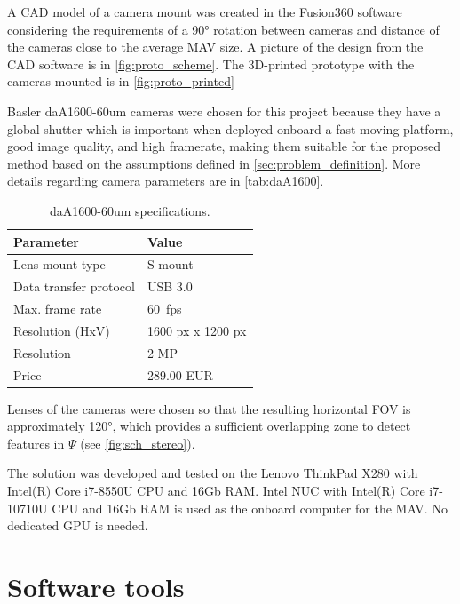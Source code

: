 A CAD model of a camera mount was created in the Fusion360 software considering the requirements of a \ang{90} rotation between cameras and distance of the cameras close to the average MAV size.
A picture of the design from the CAD software is in \autoref{fig:proto_scheme}.
The 3D-printed prototype with the cameras mounted is in \autoref{fig:proto_printed}

Basler daA1600-60um cameras were chosen for this project because they have a global shutter which is important when deployed onboard a fast-moving platform, good image quality, and high framerate, making them suitable for the proposed method based on the assumptions defined in \autoref{sec:problem_definition}. 
More details regarding camera parameters are in \autoref{tab:daA1600}.

\begin{table}
    \begin{center}
      \begin{tabular}{ l l }
      \hline
      Parameter              & Value             \\ \hline
      Lens mount type        & S-mount           \\
      Data transfer protocol & USB 3.0           \\
      Max. frame rate        & \SI{60}{fps}            \\
      Resolution (HxV)       & 1600 px x 1200 px \\
      Resolution             & 2 MP              \\
      Price                  & 289.00 EUR        \\ \hline
      \end{tabular}
    \end{center}
    \caption{daA1600-60um specifications.}
    \label{tab:daA1600}
\end{table}

Lenses of the cameras were chosen so that the resulting horizontal FOV is approximately \ang{120}, which provides a sufficient overlapping zone to detect features in $\Psi$ (see \autoref{fig:sch_stereo}).

The solution was developed and tested on the Lenovo ThinkPad X280 with Intel(R) Core i7-8550U CPU and 16Gb RAM.
Intel NUC with Intel(R) Core i7-10710U CPU and 16Gb RAM is used as the onboard computer for the MAV.
No dedicated GPU is needed.

\section{Software tools}
\label{sec:impl_software}

